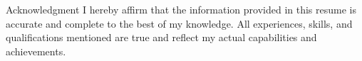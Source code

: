 \documentclass{resume} %
\begin{document}
\vspace{4em}
\begin{rSection}{Acknowledgment} 
{I hereby affirm that the information provided in this resume is accurate and complete to the best of my knowledge. All experiences, skills, and qualifications mentioned are true and reflect my actual capabilities and achievements.}
\end{rSection}
\end{document}

